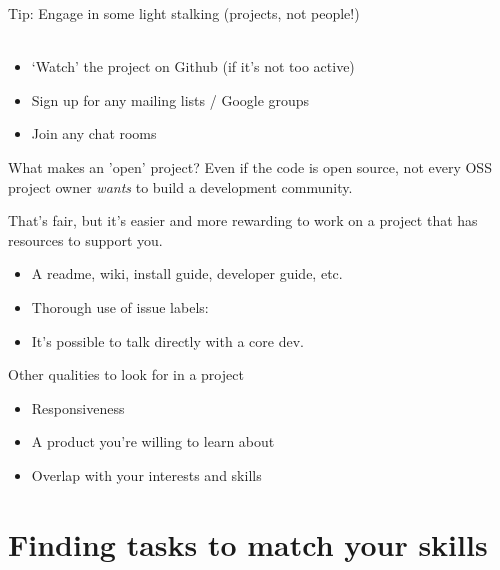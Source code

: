 \documentclass{beamer}
\begin{document}
\begin{frame}{Tip: Engage in some light stalking (projects, not people!)}
	\\
	\\
	\begin{itemize}
		\item `Watch' the project on Github (if it's not too active)
		\item Sign up for any mailing lists / Google groups
		\item Join any chat rooms
	\end{itemize}
\end{frame}


\begin{frame}{What makes an 'open' project?}
	Even if the code is open source, not every OSS project owner \textit{wants} to build a development community.\\
	\vskip10pt
	
	That's fair, but it's easier and more rewarding to work on a project that has resources to support you.\\[10pt]
	
	\begin{itemize}
		\item A readme, wiki, install guide, developer guide, etc.\\
		\item Thorough use of issue labels: 
		\item It's possible to talk directly with a core dev.\\
	\end{itemize}
\end{frame}

\begin{frame}{Other qualities to look for in a project}
	\begin{itemize}
		\item Responsiveness
		\item A product you're willing to learn about
		\item Overlap with your interests and skills
	\end{itemize}
\end{frame}


\section{Finding tasks to match your skills}
\end{document}
